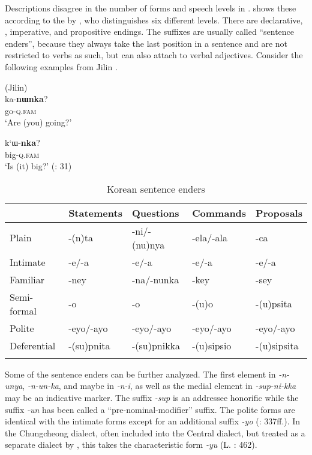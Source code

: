 Descriptions disagree in the number of forms and speech levels in .  shows these according to the  by \citet{Song2005}, who distinguishes six different levels. There are declarative, , imperative, and propositive endings. The suffixes are usually called “sentence enders”, because they always take the last position in a sentence and are not restricted to verbs as such, but can also attach to verbal adjectives. Consider the following examples from Jilin .

\ea%
    \label{ex:kore:3}
     (Jilin)\\
    \ea
    \gll ka-\textbf{{nɯnka}}?\\
    go-\textsc{q}.\textsc{fam}\\
    \glt ‘Are (you) going?’
    
    \ex
    \gll k‘ɯ-\textbf{{nka}}?\\
     big-\textsc{q}.\textsc{fam}\\
    \glt ‘Is (it) big?’ (\citealt{XuanDewu1985}: 31)
    \z
    \z

\begin{table}
\caption{Korean sentence enders \citep[125]{Song2005}}
\label{tab:kore:1}

\begin{tabularx}{\textwidth}{XXXXl}
\lsptoprule
& \textbf{Statements} & \textbf{Questions} & \textbf{Commands} & \textbf{Proposals}\\
\midrule
Plain & -(n)ta & -ni/-(nu)nya & -ela/-ala & -ca\\
Intimate & -e/-a & -e/-a & -e/-a & -e/-a\\
Familiar & -ney & -na/-nunka & -key & -sey\\
Semi-formal & -o & -o & -(u)o & -(u)psita\\
Polite & -eyo/-ayo & -eyo/-ayo & -eyo/-ayo & -eyo/-ayo\\
Deferential & -(su)pnita & -(su)pnikka & -(u)sipsio & -(u)sipsita\\
\lspbottomrule
\end{tabularx}
\end{table}

Some of the sentence enders can be further analyzed. The first element in \textit{-n-unya}, \textit{-n-un-ka}, and maybe in \textit{-n-i}, as well as the medial element in \textit{-sup-ni-kka} may be an indicative marker. The suffix \textit{-sup} is an addressee honorific while the suffix \textit{-un} has been called a “pre-nominal-modifier” suffix. The polite forms are identical with the intimate forms except for an additional suffix \textit{-yo} (\citealt{Sohn1994}: 337ff.). In the Chungcheong dialect, often included into the Central dialect, but treated as a separate dialect by \citet[58]{Sohn1999}, this takes the characteristic form \textit{-yu} (L. \citealt{BrownYeon2015}: 462).

